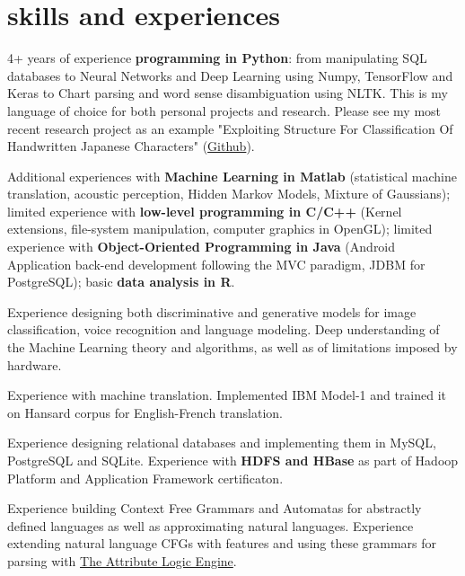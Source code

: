 \documentclass[]{cv-roald}
\begin{document}
\section*{skills and experiences}
\begin{tabitemize}
    \item 4+ years of experience \textbf{programming in Python}: from manipulating SQL databases to Neural Networks and Deep Learning using Numpy, TensorFlow and Keras to Chart parsing and word sense disambiguation using NLTK. This is my language of choice for both personal projects and research. Please see my most recent research project as an example "Exploiting Structure For Classification Of Handwritten Japanese Characters" (\href{https://github.com/balayanr/kanji_recognition_412}{Github}).
    \item Additional experiences with \textbf{Machine Learning in Matlab} (statistical machine translation, acoustic perception, Hidden Markov Models, Mixture of Gaussians); limited experience with \textbf{low-level programming in C/C++} (Kernel extensions, file-system manipulation, computer graphics in OpenGL); limited experience with \textbf{Object-Oriented Programming in Java} (Android Application back-end development following the MVC paradigm, JDBM for PostgreSQL); basic \textbf{data analysis in R}.
    \item Experience designing both discriminative and generative models for image classification, voice recognition and language modeling. Deep understanding of the Machine Learning theory and algorithms, as well as of limitations imposed by hardware.
    \item Experience with machine translation. Implemented IBM Model-1 and trained it on Hansard corpus for English-French translation.
    \item Experience designing relational databases and implementing them in MySQL, PostgreSQL and SQLite. Experience with \textbf{HDFS and HBase} as part of Hadoop Platform and Application Framework certificaton.
    \item Experience building Context Free Grammars and Automatas for abstractly defined languages as well as approximating natural languages. Experience extending natural language CFGs with features and using these grammars for parsing with \href{http://www.cs.toronto.edu/~gpenn/ale.html}{The Attribute Logic Engine}.

\end{tabitemize}
\clearpage
\end{document}
